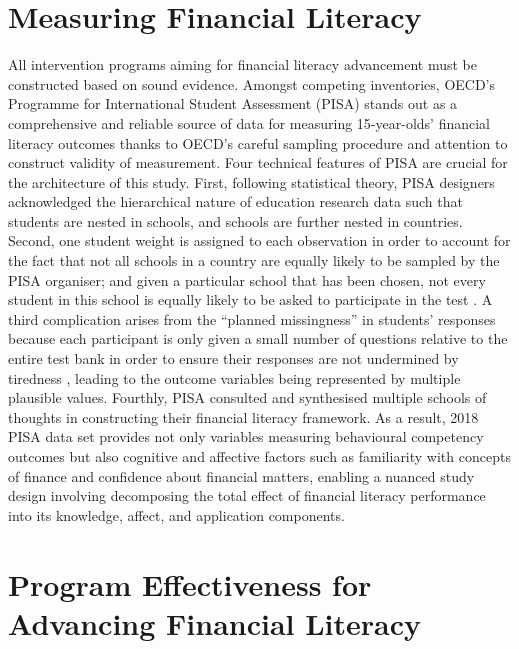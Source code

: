 \documentclass[a4paper,11pt,UKenglish,twoside,openright]{report}\usepackage[]{graphicx}\usepackage[]{color}
\begin{document}
\section{Measuring Financial Literacy}

All intervention programs aiming for financial literacy advancement must be constructed based on sound evidence. Amongst competing inventories, OECD's Programme for International Student Assessment (PISA) stands out as a comprehensive and reliable source of data for measuring 15-year-olds' financial literacy outcomes thanks to OECD's careful sampling procedure and attention to construct validity of measurement. Four technical features of PISA are crucial for the architecture of this study. First, following statistical theory, PISA designers acknowledged the hierarchical nature of education research data such that students are nested in schools, and schools are further nested in countries. Second, one student weight is assigned to each observation in order to account for the fact that not all schools in a country are equally likely to be sampled by the PISA organiser; and given a particular school that has been chosen, not every student in this school is equally likely to be asked to participate in the test \parencite{rust:2014}. A third complication arises from the ``planned missingness'' in students' responses because each participant is only given a small number of questions relative to the entire test bank in order to ensure their responses are not undermined by tiredness \parencite{vondavier:2014}, leading to the outcome variables being represented by multiple plausible values. Fourthly, PISA consulted and synthesised multiple schools of thoughts \parencite{PISAframework} in constructing their financial literacy framework. As a result, 2018 PISA data set \parencite{FLdata} provides not only variables measuring behavioural competency outcomes but also cognitive and affective factors such as familiarity with concepts of finance and confidence about financial matters, enabling a nuanced study design involving decomposing the total effect of financial literacy performance into its knowledge, affect, and application components.

\section{Program Effectiveness for Advancing Financial Literacy}
\end{document}
